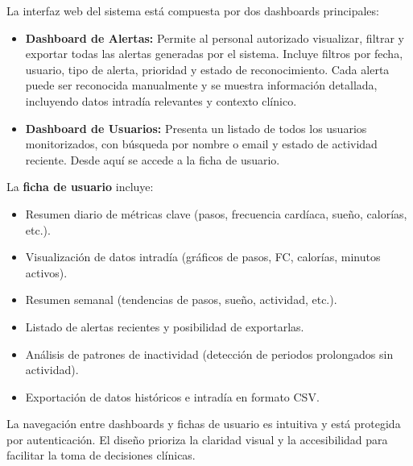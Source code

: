 La interfaz web del sistema está compuesta por dos dashboards principales:

\begin{itemize}
    \item \textbf{Dashboard de Alertas:} Permite al personal autorizado visualizar, filtrar y exportar todas las alertas generadas por el sistema. Incluye filtros por fecha, usuario, tipo de alerta, prioridad y estado de reconocimiento. Cada alerta puede ser reconocida manualmente y se muestra información detallada, incluyendo datos intradía relevantes y contexto clínico.
    \item \textbf{Dashboard de Usuarios:} Presenta un listado de todos los usuarios monitorizados, con búsqueda por nombre o email y estado de actividad reciente. Desde aquí se accede a la ficha de usuario.
\end{itemize}

La \textbf{ficha de usuario} incluye:
\begin{itemize}
    \item Resumen diario de métricas clave (pasos, frecuencia cardíaca, sueño, calorías, etc.).
    \item Visualización de datos intradía (gráficos de pasos, FC, calorías, minutos activos).
    \item Resumen semanal (tendencias de pasos, sueño, actividad, etc.).
    \item Listado de alertas recientes y posibilidad de exportarlas.
    \item Análisis de patrones de inactividad (detección de periodos prolongados sin actividad).
    \item Exportación de datos históricos e intradía en formato CSV.
\end{itemize}

La navegación entre dashboards y fichas de usuario es intuitiva y está protegida por autenticación. El diseño prioriza la claridad visual y la accesibilidad para facilitar la toma de decisiones clínicas.
